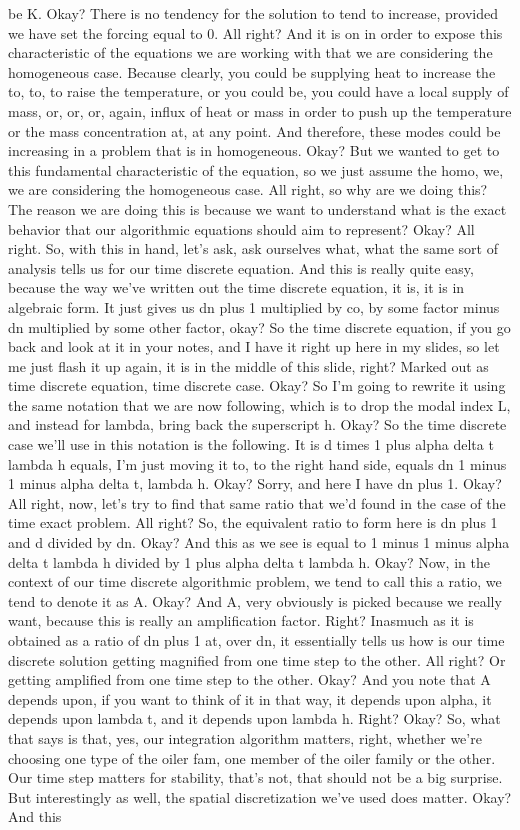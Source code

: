 \documentclass[10pt]{article}
\begin{document}
be K. Okay? There is no tendency for the solution to tend to increase, provided we have set the forcing equal to 0. All right? And it is on in order to expose this characteristic of the equations we are working with that we are considering the homogeneous case. Because clearly, you could be supplying heat to increase the to, to, to raise the temperature, or you could be, you could have a local supply of mass, or, or, or, again, influx of heat or mass in order to push up the temperature or the mass concentration at, at any point. And therefore, these modes could be increasing in a problem that is in homogeneous. Okay? But we wanted to get to this fundamental characteristic of the equation, so we just assume the homo, we, we are considering the homogeneous case. All right, so why are we doing this? The reason we are doing this is because we want to understand what is the exact behavior that our algorithmic equations should aim to represent? Okay? All right. So, with this in hand, let's ask, ask ourselves what, what the same sort of analysis tells us for our time discrete equation. And this is really quite easy, because the way we've written out the time discrete equation, it is, it is in algebraic form. It just gives us dn plus 1 multiplied by co, by some factor minus dn multiplied by some other factor, okay? So the time discrete equation, if you go back and look at it in your notes, and I have it right up here in my slides, so let me just flash it up again, it is in the middle of this slide, right? Marked out  as time discrete equation, time discrete case. Okay? So I'm going to rewrite it using the same notation that we are now following, which is to drop the modal index L, and instead for lambda, bring back the superscript h. Okay? So the time discrete case we'll use in this notation is the following. It is d times 1 plus alpha delta t lambda h equals, I'm just moving it to, to the right hand side, equals dn 1 minus 1 minus alpha delta t, lambda h. Okay? Sorry, and here I have dn plus 1. Okay? All right, now, let's try to find that same ratio that we'd found in the case of the time exact problem. All right? So, the equivalent ratio to form here is dn plus 1 and d divided by dn. Okay? And this as we see is equal to 1 minus 1 minus alpha delta t lambda h divided by 1 plus alpha delta t lambda h. Okay? Now, in the context of our time discrete algorithmic problem, we tend to call this a ratio, we tend to denote it as A. Okay? And A, very obviously is picked because we really want, because this is really an amplification factor. Right? Inasmuch as it is obtained as a ratio of dn plus 1 at, over dn, it essentially tells us how is our time discrete solution getting magnified from one time step to the other. All right? Or getting amplified from one time step to the other. Okay? And you note that A depends upon, if you want to think of it in that way, it depends upon alpha, it depends upon lambda t, and it depends upon lambda h. Right? Okay? So, what that says is that, yes, our integration algorithm matters, right, whether we're choosing one type of the oiler fam, one member of the oiler family or the other. Our time step matters for stability, that's not, that should not be a big surprise. But interestingly as well, the spatial discretization we've used does matter. Okay? And this 
\end{document}
